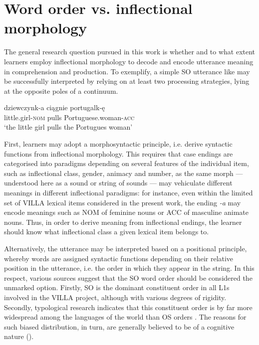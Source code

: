 \section{Word order vs. inflectional morphology}\label{sec:01:1}

The general research question pursued in this work is whether and to what extent learners employ inflectional morphology to decode and encode utterance meaning in comprehension and production. To exemplify, a simple SO utterance like  may be successfully interpreted by relying on at least two processing strategies, lying at the opposite poles of a continuum. 

\ea%
    \label{ex:01:3}
    \gll    dziewczynk-a ciągnie portugalk-ę\\
            little.girl-\textsc{nom} pulls Portuguese.woman-\textsc{acc}\\
    \glt    ‘the little girl pulls the Portugues woman’
    \z

First, learners may adopt a morphosyntactic principle, i.e. derive syntactic functions from inflectional morphology. This requires that case endings are categorised into paradigms depending on several features of the individual item, such as inflectional class, gender, animacy and number, as the same morph — understood here as a sound or string of sounds — may vehiculate different meanings in different inflectional paradigms: for instance, even within the limited set of VILLA lexical items considered in the present work, the ending \textit{{}-a} may encode meanings such as NOM of feminine nouns or ACC of masculine animate nouns. Thus, in order to derive meaning from inflectional endings, the learner should know what inflectional class a given lexical item belongs to.

Alternatively, the utterance may be interpreted based on a positional principle, whereby words are assigned syntactic functions depending on their relative position in the utterance, i.e. the order in which they appear in the string. In this respect, various sources suggest that the SO word order should be considered the unmarked option. Firstly, SO is the dominant constituent order in all L1s involved in the VILLA project, although with various degrees of rigidity. Secondly, typological research indicates that this constituent order is by far more widespread among the languages of the world than OS orders \citep{Dryer2013b}. The reasons for such biased distribution, in turn, are generally believed to be of a cognitive nature (\citealt{SiewierskaBakker2008}).

